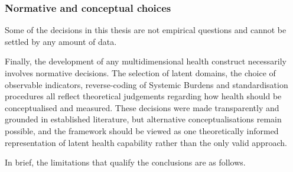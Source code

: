 \subsubsection{Normative and conceptual choices}

Some of the decisions in this thesis are not empirical questions and cannot be
settled by any amount of data.

Finally, the development of any multidimensional health construct necessarily involves normative decisions. The selection of latent domains, the choice of observable indicators, reverse-coding of Systemic Burdens and standardisation procedures all reflect theoretical judgements regarding how health should be conceptualised and measured. These decisions were made transparently and grounded in established literature, but alternative conceptualisations remain possible, and the framework should be viewed as one theoretically informed representation of latent health capability rather than the only valid approach.

In brief, the limitations that qualify the conclusions are as follows.

